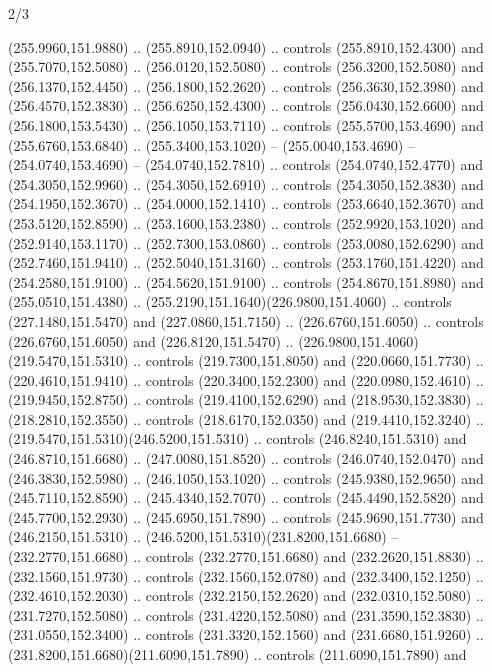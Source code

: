 \begin{flagdescription}{2/3}
\begin{scope}[xshift=0.5\flaglength,yshift=0.5\flagwidth,scale=\flagwidth/259.2]
\begin{scope}[y=0.8pt, x=0.8pt, yscale=-1,shift={(-243,-162)}]
      (255.9960,151.9880) .. (255.8910,152.0940) .. controls (255.8910,152.4300) and
      (255.7070,152.5080) .. (256.0120,152.5080) .. controls (256.3200,152.5080) and
      (256.1370,152.4450) .. (256.1800,152.2620) .. controls (256.3630,152.3980) and
      (256.4570,152.3830) .. (256.6250,152.4300) .. controls (256.0430,152.6600) and
      (256.1800,153.5430) .. (256.1050,153.7110) .. controls (255.5700,153.4690) and
      (255.6760,153.6840) .. (255.3400,153.1020) -- (255.0040,153.4690) --
      (254.0740,153.4690) -- (254.0740,152.7810) .. controls (254.0740,152.4770) and
      (254.3050,152.9960) .. (254.3050,152.6910) .. controls (254.3050,152.3830) and
      (254.1950,152.3670) .. (254.0000,152.1410) .. controls (253.6640,152.3670) and
      (253.5120,152.8590) .. (253.1600,153.2380) .. controls (252.9920,153.1020) and
      (252.9140,153.1170) .. (252.7300,153.0860) .. controls (253.0080,152.6290) and
      (252.7460,151.9410) .. (252.5040,151.3160) .. controls (253.1760,151.4220) and
      (254.2580,151.9100) .. (254.5620,151.9100) .. controls (254.8670,151.8980) and
      (255.0510,151.4380) .. (255.2190,151.1640)(226.9800,151.4060) .. controls
      (227.1480,151.5470) and (227.0860,151.7150) .. (226.6760,151.6050) .. controls
      (226.6760,151.6050) and (226.8120,151.5470) ..
      (226.9800,151.4060)(219.5470,151.5310) .. controls (219.7300,151.8050) and
      (220.0660,151.7730) .. (220.4610,151.9410) .. controls (220.3400,152.2300) and
      (220.0980,152.4610) .. (219.9450,152.8750) .. controls (219.4100,152.6290) and
      (218.9530,152.3830) .. (218.2810,152.3550) .. controls (218.6170,152.0350) and
      (219.4410,152.3240) .. (219.5470,151.5310)(246.5200,151.5310) .. controls
      (246.8240,151.5310) and (246.8710,151.6680) .. (247.0080,151.8520) .. controls
      (246.0740,152.0470) and (246.3830,152.5980) .. (246.1050,153.1020) .. controls
      (245.9380,152.9650) and (245.7110,152.8590) .. (245.4340,152.7070) .. controls
      (245.4490,152.5820) and (245.7700,152.2930) .. (245.6950,151.7890) .. controls
      (245.9690,151.7730) and (246.2150,151.5310) ..
      (246.5200,151.5310)(231.8200,151.6680) -- (232.2770,151.6680) .. controls
      (232.2770,151.6680) and (232.2620,151.8830) .. (232.1560,151.9730) .. controls
      (232.1560,152.0780) and (232.3400,152.1250) .. (232.4610,152.2030) .. controls
      (232.2150,152.2620) and (232.0310,152.5080) .. (231.7270,152.5080) .. controls
      (231.4220,152.5080) and (231.3590,152.3830) .. (231.0550,152.3400) .. controls
      (231.3320,152.1560) and (231.6680,151.9260) ..
      (231.8200,151.6680)(211.6090,151.7890) .. controls (211.6090,151.7890) and

\end{scope}
\end{scope}
\end{flagdescription}
